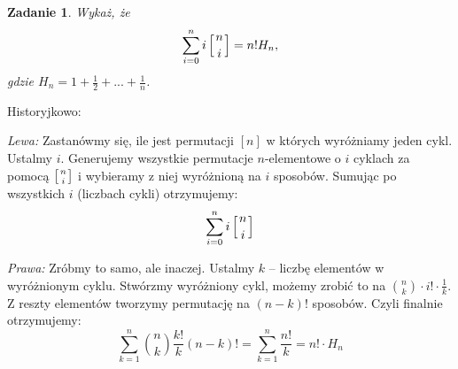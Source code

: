 \documentclass{mwbk}
\newtheorem{zad}{Zadanie}[chapter]
\begin{document}
\begin{zad}
    Wykaż, że
    \[
        \sum_{i=0}^{n} i \left[ n \atop i \right] = n! H_n,
    \]
    gdzie $H_n = 1 + \frac{1}{2} + ... + \frac{1}{n}$.
\end{zad}
\begin{mdframed}
    Historyjkowo:

    \textit{Lewa:}
    Zastanówmy się, ile jest permutacji $[n]$ w których wyróżniamy jeden cykl.
    Ustalmy $i$. Generujemy wszystkie permutacje $n$-elementowe o $i$ cyklach za pomocą
    $\left[ n \atop i \right]$ i wybieramy z niej wyróżnioną na $i$ sposobów.
    Sumując po wszystkich $i$ (liczbach cykli) otrzymujemy:
    \[\sum_{i=0}^{n} i \left[ n \atop i \right]\]

    \textit{Prawa:}
    Zróbmy to samo, ale inaczej. Ustalmy $k$ -- liczbę elementów
    w wyróżnionym cyklu. Stwórzmy wyróżniony cykl,
    możemy zrobić to na $\binom{n}{k} \cdot i! \cdot \frac{1}{k}$.
    Z reszty elementów tworzymy permutację na $(n-k)!$ sposobów.
    Czyli finalnie otrzymujemy:
    \[
        \sum_{k=1}^{n}\binom{n}{k}\frac{k!}{k}(n-k)! = \sum_{k=1}^{n}\frac{n!}{k} = n! \cdot H_n
    \]




\end{mdframed}
\end{document}
